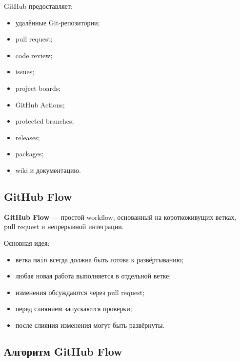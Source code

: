 \documentclass[12pt,a4paper]{article}
\begin{document}
GitHub предоставляет:

\begin{itemize}
    \item удалённые Git-репозитории;
    \item pull request;
    \item code review;
    \item issues;
    \item project boards;
    \item GitHub Actions;
    \item protected branches;
    \item releases;
    \item packages;
    \item wiki и документацию.
\end{itemize}

\subsection{GitHub Flow}

\textbf{GitHub Flow} --- простой workflow, основанный на короткоживущих ветках, pull request и непрерывной интеграции.

Основная идея:

\begin{itemize}
    \item ветка \texttt{main} всегда должна быть готова к развёртыванию;
    \item любая новая работа выполняется в отдельной ветке;
    \item изменения обсуждаются через pull request;
    \item перед слиянием запускаются проверки;
    \item после слияния изменения могут быть развёрнуты.
\end{itemize}

\subsection{Алгоритм GitHub Flow}
\end{document}
